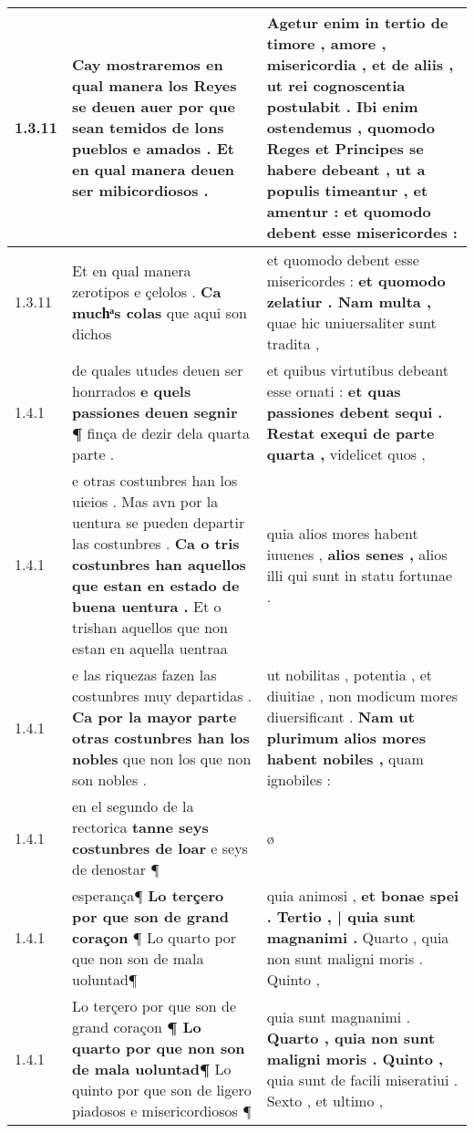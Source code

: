 \begin{tabular}{|p{1cm}|p{6.5cm}|p{6.5cm}|}
1.3.11 & Cay mostraremos en qual manera los Reyes se deuen auer \textbf{ por que sean temidos de lons pueblos e amados . } Et en qual manera deuen ser mibicordiosos . & Agetur enim in tertio de timore , amore , misericordia , et de aliis , \textbf{ ut rei cognoscentia postulabit . Ibi enim ostendemus , quomodo Reges et Principes se habere debeant , ut a populis timeantur , et amentur : } et quomodo debent esse misericordes : \\\hline
1.3.11 & Et en qual manera zerotipos e çelolos . \textbf{ Ca muchͣs colas } que aqui son dichos & et quomodo debent esse misericordes : \textbf{ et quomodo zelatiur . Nam multa , } quae hic uniuersaliter sunt tradita , \\\hline
1.4.1 & de quales utudes deuen ser honrrados \textbf{ e quels passiones deuen segnir ¶ } finça de dezir dela quarta parte . & et quibus virtutibus debeant esse ornati : \textbf{ et quas passiones debent sequi . Restat exequi de parte quarta , } videlicet quos , \\\hline
1.4.1 & e otras costunbres han los uieios . Mas avn por la uentura se pueden departir las costunbres . \textbf{ Ca o tris costunbres han aquellos que estan en estado de buena uentura . } Et o trishan aquellos que non estan en aquella uentraa & quia alios mores habent iuuenes , \textbf{ alios senes , } alios illi qui sunt in statu fortunae . \\\hline
1.4.1 & e las riquezas fazen las costunbres muy departidas . \textbf{ Ca por la mayor parte otras costunbres han los nobles } que non los que non son nobles . & ut nobilitas , potentia , et diuitiae , non modicum mores diuersificant . \textbf{ Nam ut plurimum alios mores habent nobiles , } quam ignobiles : \\\hline
1.4.1 & en el segundo de la rectorica \textbf{ tanne seys costunbres de loar } e seys de denostar ¶ & ø \\\hline
1.4.1 & esperança¶ \textbf{ Lo terçero por que son de grand coraçon } ¶ Lo quarto por que non son de mala uoluntad¶ & quia animosi , \textbf{ et bonae spei . Tertio , | quia sunt magnanimi . } Quarto , quia non sunt maligni moris . Quinto , \\\hline
1.4.1 & Lo terçero por que son de grand coraçon \textbf{ ¶ Lo quarto por que non son de mala uoluntad¶ } Lo quinto por que son de ligero piadosos e misericordiosos ¶ & quia sunt magnanimi . \textbf{ Quarto , quia non sunt maligni moris . Quinto , } quia sunt de facili miseratiui . Sexto , et ultimo , \\\hline

\end{tabular}
